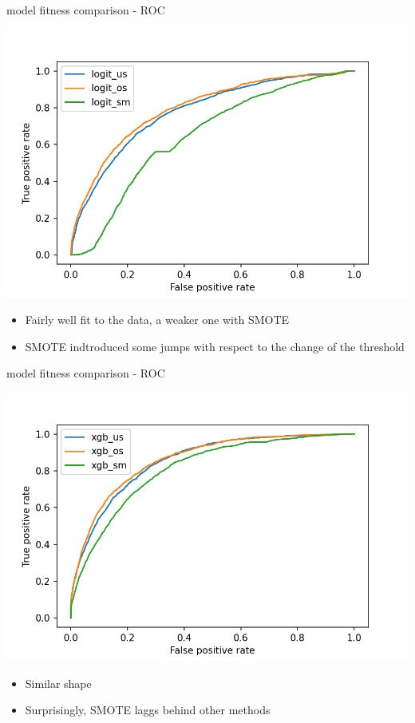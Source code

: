 \documentclass{beamer}
\begin{document}
\begin{frame}{model fitness comparison - ROC}

\begin{center}
\includegraphics[scale=0.5]{img/log_roc.png}
\end{center}

\begin{itemize}
\item Fairly well fit to the data, a weaker one with SMOTE
\item SMOTE indtroduced some jumps with respect to the change of the threshold
\end{itemize}

\end{frame}

\begin{frame}{model fitness comparison - ROC}

\begin{center}
\includegraphics[scale=0.54]{img/xgb_roc.png}
\end{center}

\begin{itemize}
\item Similar shape
\item Surprisingly, SMOTE laggs behind other methods
\end{itemize}

\end{frame}
\end{document}
